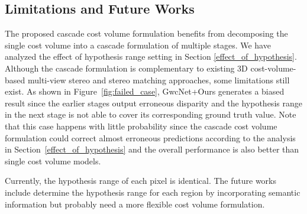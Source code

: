 \documentclass[10pt,twocolumn,letterpaper]{article}
\begin{document}
\subsection{Limitations and Future Works}
The proposed cascade cost volume formulation benefits from decomposing the single cost volume into a cascade formulation of multiple stages. We have analyzed the effect of hypothesis range setting in Section \ref{effect_of_hypothesis}. Although the cascade formulation is complementary to existing 3D cost-volume-based multi-view stereo and stereo matching approaches, some limitations still exist.
As shown in Figure~\ref{fig:failed_case}, GwcNet+Ours generates a biased result since the earlier stages output erroneous disparity and the hypothesis range in the next stage is not able to cover its corresponding ground truth value. Note that this case happens with little probability since the cascade cost volume formulation could correct almost erroneous predictions according to the analysis in Section~\ref{effect_of_hypothesis} and the overall performance is also better than single cost volume models. 

Currently, the hypothesis range of each pixel is identical. The future works include determine the hypothesis range for each region by incorporating semantic information but probably need a more flexible cost volume formulation.  
\end{document}
